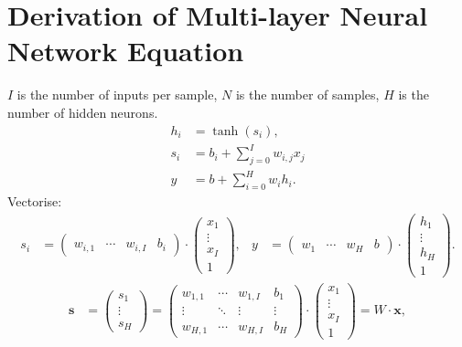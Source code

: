 \section{Derivation of Multi-layer Neural Network Equation}
$I$ is the number of inputs per sample,
$N$ is the number of samples,
$H$ is the number of hidden neurons.
\begin{align*}
    h_i &= \tanh(s_i),\\
    s_i &= b_i + \sum_{j=0}^{I} w_{i,j} x_j\\
    y &= b + \sum_{i=0}^{H} w_i h_i.
\end{align*}
Vectorise:
\begin{align*}
    s_i &=
        \begin{pmatrix}
            w_{i,1} & \cdots & w_{i,I} & b_i
        \end{pmatrix}
        \cdot
        \begin{pmatrix}
            x_1 \\ \vdots \\ x_I \\ 1
        \end{pmatrix},
    &
    y &=
        \begin{pmatrix}
            w_1 & \cdots & w_H & b
        \end{pmatrix}
        \cdot
        \begin{pmatrix}
            h_1 \\ \vdots \\ h_H \\ 1
        \end{pmatrix}.
\end{align*}
\begin{align*}
    \mathbf{s} &= \begin{pmatrix} s_1 \\ \vdots \\ s_H \end{pmatrix}
    =
    \begin{pmatrix}
        w_{1,1} & \cdots & w_{1,I} & b_1\\
        \vdots  & \ddots & \vdots  & \vdots\\
        w_{H,1} & \cdots & w_{H,I} & b_H
    \end{pmatrix}
    \cdot
    \begin{pmatrix}
        x_1 \\ \vdots \\ x_I \\ 1
    \end{pmatrix}
    = W\cdot\mathbf{x},
\end{align*}

